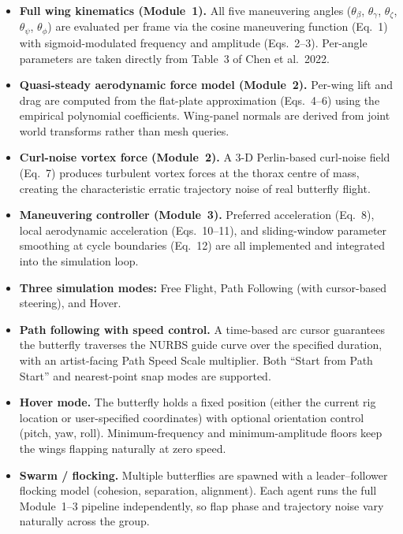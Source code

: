 \documentclass[12pt]{article}
\begin{document}
\begin{itemize}
  \item \textbf{Full wing kinematics (Module~1).} All five maneuvering angles
    ($\theta_\beta$, $\theta_\gamma$, $\theta_\zeta$, $\theta_\psi$,
    $\theta_\phi$) are evaluated per frame via the cosine maneuvering function
    (Eq.~1) with sigmoid-modulated frequency and amplitude (Eqs.~2--3).
    Per-angle parameters are taken directly from Table~3 of Chen et al.\ 2022.

  \item \textbf{Quasi-steady aerodynamic force model (Module~2).} Per-wing
    lift and drag are computed from the flat-plate approximation (Eqs.~4--6)
    using the empirical polynomial coefficients. Wing-panel normals are derived
    from joint world transforms rather than mesh queries.

  \item \textbf{Curl-noise vortex force (Module~2).} A 3-D Perlin-based
    curl-noise field (Eq.~7) produces turbulent vortex forces at the thorax
    centre of mass, creating the characteristic erratic trajectory noise of
    real butterfly flight.

  \item \textbf{Maneuvering controller (Module~3).} Preferred acceleration
    (Eq.~8), local aerodynamic acceleration (Eqs.~10--11), and sliding-window
    parameter smoothing at cycle boundaries (Eq.~12) are all implemented and
    integrated into the simulation loop.

  \item \textbf{Three simulation modes:} Free Flight, Path Following (with
    cursor-based steering), and Hover.

  \item \textbf{Path following with speed control.} A time-based arc cursor
    guarantees the butterfly traverses the NURBS guide curve over the specified
    duration, with an artist-facing Path Speed Scale multiplier. Both
    ``Start from Path Start'' and nearest-point snap modes are supported.

  \item \textbf{Hover mode.} The butterfly holds a fixed position (either the
    current rig location or user-specified coordinates) with optional
    orientation control (pitch, yaw, roll). Minimum-frequency and
    minimum-amplitude floors keep the wings flapping naturally at zero speed.

  \item \textbf{Swarm / flocking.} Multiple butterflies are spawned with a
    leader--follower flocking model (cohesion, separation, alignment). Each
    agent runs the full Module~1--3 pipeline independently, so flap phase and
    trajectory noise vary naturally across the group.


\end{itemize}
\end{document}
